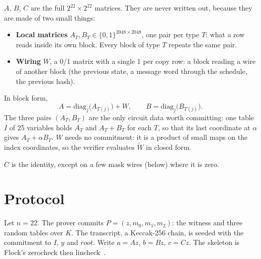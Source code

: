\documentclass[11pt]{article}
\newcommand{\K}{K}
\newcommand{\mle}[1]{\widetilde{#1}}
\newcommand{\rootnode}{\mathit{root}}
\newcommand{\idx}{I}
\begin{document}
$A$, $B$, $C$ are the full $2^{22} \times 2^{22}$ matrices. They are never written out, because they are made of two small things:
\begin{itemize}
  \item \textbf{Local matrices} $A_T, B_T \in \{0,1\}^{2048 \times 2048}$, one pair per type $T$: what a row reads inside its own block. Every block of type $T$ repeats the same pair.
  \item \textbf{Wiring} $W$, a 0/1 matrix with a single 1 per copy row: a block reading a wire of another block (the previous state, a message word through the schedule, the previous hash).
\end{itemize}
In block form,
\[
  A = \mathrm{diag}_j\bigl(A_{T(j)}\bigr) + W, \qquad B = \mathrm{diag}_j\bigl(B_{T(j)}\bigr) .
\]
The three pairs $(A_T, B_T)$ are the only circuit data worth committing: one table $\idx$ of 25 variables holds $A_T$ and $A_T + B_T$ for each $T$, so that its last coordinate at $\alpha$ gives $A_T + \alpha B_T$. $W$ needs no commitment: it is a product of small maps on the index coordinates, so the verifier evaluates $\mle W$ in closed form.

$C$ is the identity, except on a few mask wires (below) where it is zero.

\section{Protocol}

Let $n = 22$. The prover commits $P = (z, m_0, m_1, m_2)$: the witness and three random tables over $\K$. The transcript, a Keccak-256 chain, is seeded with the commitment to $\idx$, $y$ and $\rootnode$. Write $a = Az$, $b = Bz$, $c = Cz$. The skeleton is Flock's zerocheck then lincheck~\cite{Flock26}.
\end{document}
